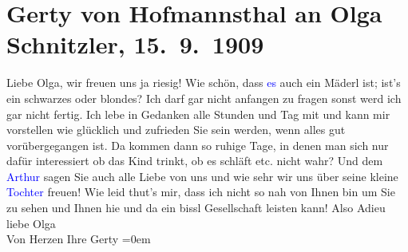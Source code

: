 

               \section[Gerty von Hofmannsthal an Olga Schnitzler, 15. 9. 1909]{ Gerty von Hofmannsthal an Olga Schnitzler, 15. 9. 1909}\nopagebreak{}\rehead{ }\normalsize\beginnumbering{} \toendnotes[C]{\smallbreak\pagebreak[2]} 
\toendnotes[C]{\smallbreak}\pstart
           \raggedleft{}{\pb}\label{K_L01876_1v}\label{K_L01876_1h}\pend
           \pstart
           Liebe Olga, wir freuen uns ja riesig! Wie schön, dass \textcolor{blue}{es}{} auch ein Mäderl ist;
                    ist’s ein schwarzes oder blondes? Ich darf gar nicht anfangen zu fragen sonst
                    werd ich gar nicht fertig. Ich lebe in Gedanken alle Stunden und Tag mit und
                    kann mir vorstellen wie {\pb}glücklich
                    und zufrieden Sie sein werden, wenn alles gut vorübergegangen ist. Da kommen
                    dann so ruhige Tage, in denen man sich nur dafür interessiert ob das Kind
                    trinkt, ob es schläft etc. nicht wahr?\pend
           \pstart
           Und dem \textcolor{blue}{Arthur}{}\ledrightnote{} sagen Sie auch alle Liebe von
                    uns {\pb}und wie sehr wir uns über
                    seine kleine \textcolor{blue}{Tochter}{}
                    freuen!\pend
           \pstart
           Wie leid thut’s mir, dass ich nicht so nah von Ihnen bin um Sie zu sehen und
                    Ihnen hie und da ein bissl Gesellschaft leisten kann!\pend
           \pstart
           Also Adieu liebe Olga{\\[\baselineskip]}Von Herzen Ihre \spacefill\mbox{Gerty}\pend
           \leftskip=0em{}\endnumbering{}  
      